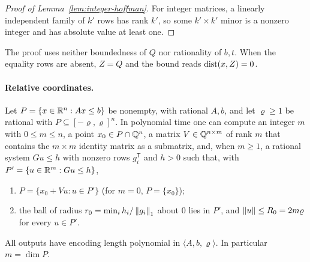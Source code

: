 \begin{proof}[Proof of Lemma~\ref{lem:integer-hoffman}]
For integer matrices, a linearly independent family of $k'$ rows has rank
$k'$, so some $k'\times k'$ minor is a nonzero integer and has absolute value
at least one.
\end{proof}

The proof uses neither boundedness of $Q$ nor rationality of $b,t$. When
the equality rows are absent, $Z=Q$ and the bound reads $\operatorname{dist}(x,Z)=0$.

\paragraph{Relative coordinates.}

\begin{lemma}\label{lem:points-relative}
Let $P=\{x\in\mathbb R^n:Ax\le b\}$ be nonempty, with rational $A,b$, and let
$\varrho\ge1$ be rational with $P\subseteq[-\varrho,\varrho]^n$. In
polynomial time one can compute an integer $m$ with $0\le m\le n$, a point
$x_0\in P\cap\mathbb Q^n$, a matrix $V\in\mathbb Q^{n\times m}$ of rank $m$ that contains
the $m\times m$ identity matrix as a submatrix, and, when $m\ge1$, a
rational system $Gu\le h$ with nonzero rows $g_i^{\mathsf T}$ and $h>0$ such
that, with $P'=\{u\in\mathbb R^m:Gu\le h\}$,
\begin{enumerate}[label=(\roman*)]
\item $P=\{x_0+Vu:u\in P'\}$ (for $m=0$, $P=\{x_0\}$);
\item the ball of radius $r_0=\min_ih_i/\left\lVert g_i\right\rVert_1$ about $0$ lies in
$P'$, and $\left\lVert u\right\rVert\le R_0=2m\varrho$ for every $u\in P'$.
\end{enumerate}
All outputs have encoding length polynomial in $\langle A,b,\varrho\rangle$.
In particular $m=\dim P$.
\end{lemma}

